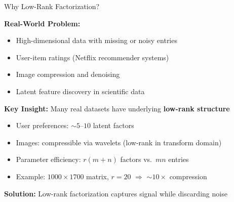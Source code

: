 \documentclass[aspectratio=169,usenames,dvipsnames]{beamer}
\begin{document}
\begin{frame}{Why Low-Rank Factorization?}
    
    \textbf{Real-World Problem:}
    \begin{itemize}
        \item High-dimensional data with missing or noisy entries
        \item User-item ratings (Netflix recommender systems)
        \item Image compression and denoising
        \item Latent feature discovery in scientific data
    \end{itemize}
    
    \vspace{0.4cm}
    
    \textbf{Key Insight:} Many real datasets have underlying \textbf{low-rank structure}
    \begin{itemize}
        \item User preferences: $\sim 5$--$10$ latent factors
        \item Images: compressible via wavelets (low-rank in transform domain)
        \item Parameter efficiency: $r(m + n)$ factors vs.\ $mn$ entries
        \item Example: $1000 \times 1700$ matrix, $r=20$ $\Rightarrow$ $\sim 10\times$ compression
    \end{itemize}
    
    \vspace{0.4cm}
    
    \textbf{Solution:} Low-rank factorization captures signal while discarding noise
\end{frame}
\end{document}
